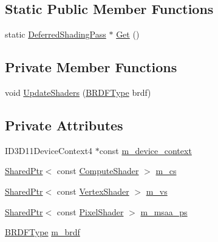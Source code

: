 \subsection*{Static Public Member Functions}
\begin{DoxyCompactItemize}
\item 
static \hyperlink{classmage_1_1_deferred_shading_pass}{Deferred\+Shading\+Pass} $\ast$ \hyperlink{classmage_1_1_deferred_shading_pass_a430dec186afda1f40c695b95fe3f7338}{Get} ()
\end{DoxyCompactItemize}
\subsection*{Private Member Functions}
\begin{DoxyCompactItemize}
\item 
void \hyperlink{classmage_1_1_deferred_shading_pass_a1be48c61dfb255a1641bae23d5277e4f}{Update\+Shaders} (\hyperlink{namespacemage_ae7a7a03a7b34d7e2689689bb8295cd38}{B\+R\+D\+F\+Type} brdf)
\end{DoxyCompactItemize}
\subsection*{Private Attributes}
\begin{DoxyCompactItemize}
\item 
I\+D3\+D11\+Device\+Context4 $\ast$const \hyperlink{classmage_1_1_deferred_shading_pass_a05b1c649f39f267ce5a5cecdd02b8ffb}{m\+\_\+device\+\_\+context}
\item 
\hyperlink{namespacemage_a1e01ae66713838a7a67d30e44c67703e}{Shared\+Ptr}$<$ const \hyperlink{namespacemage_ae040329401484b076f0cd1a7c43d19c9}{Compute\+Shader} $>$ \hyperlink{classmage_1_1_deferred_shading_pass_a8d3bebdc41d116eb05d9f5a3c923f349}{m\+\_\+cs}
\item 
\hyperlink{namespacemage_a1e01ae66713838a7a67d30e44c67703e}{Shared\+Ptr}$<$ const \hyperlink{classmage_1_1_vertex_shader}{Vertex\+Shader} $>$ \hyperlink{classmage_1_1_deferred_shading_pass_a0bf671a656df1931dc99abc636abecd1}{m\+\_\+vs}
\item 
\hyperlink{namespacemage_a1e01ae66713838a7a67d30e44c67703e}{Shared\+Ptr}$<$ const \hyperlink{namespacemage_a27ecaf266420ee7a494d64edc0757129}{Pixel\+Shader} $>$ \hyperlink{classmage_1_1_deferred_shading_pass_a2da9b0462428d209f3b546a934962a77}{m\+\_\+msaa\+\_\+ps}
\item 
\hyperlink{namespacemage_ae7a7a03a7b34d7e2689689bb8295cd38}{B\+R\+D\+F\+Type} \hyperlink{classmage_1_1_deferred_shading_pass_a5a466f5c2ee71563f4f8ed6d042ee4b3}{m\+\_\+brdf}
\end{DoxyCompactItemize}


